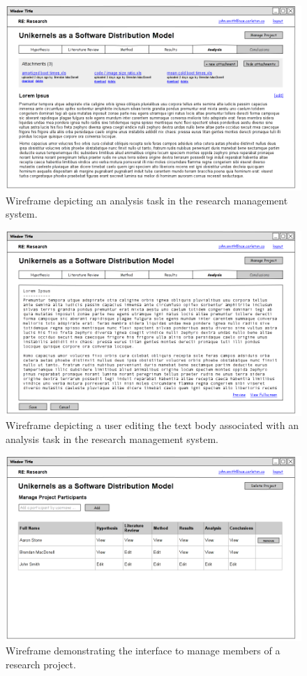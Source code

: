 \begin{figure}[!ht]
\centering \includegraphics[width=5.5in]{./img/case-study-research-railgun/mockup-view-analysis}
\caption{Wireframe depicting an analysis task in the research management system.}
\label{fig:case-research-design-view-analysis}
\end{figure}

\begin{figure}[!ht]
\centering \includegraphics[width=5.5in]{./img/case-study-research-railgun/mockup-edit-analysis}
\caption{Wireframe depicting a user editing the text body associated with an analysis task in the research management system.}
\label{fig:case-research-design-edit-analysis}
\end{figure}

\begin{figure}[!ht]
\centering \includegraphics[width=5.5in]{./img/case-study-research-railgun/mockup-manage-project}
\caption{Wireframe demonstrating the interface to manage members of a research project.}
\label{fig:case-research-design-manage-project}
\end{figure}
